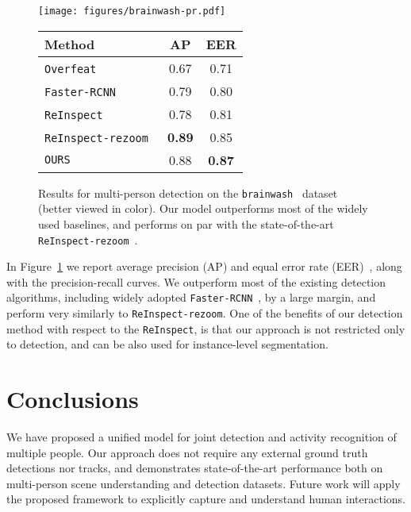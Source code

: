 \documentclass[10pt,twocolumn,letterpaper]{article}
\begin{document}
\begin{figure}[ht!]
\vspace{-0.25cm}
\begin{center}
\texttt{[image: figures/brainwash-pr.pdf]}
\vspace{0.1cm}
\begin{tabular}{|l|c|c|}
\hline
Method & AP & EER \\\hline
\texttt{Overfeat}~\cite{Sermanet2013} & 0.67 & 0.71 \\
\texttt{Faster-RCNN}~\cite{Ren2015} & 0.79 & 0.80 \\
\texttt{ReInspect}~\cite{Stewart2016} & 0.78 & 0.81 \\
\texttt{ReInspect-rezoom}~\cite{Stewart2016} & \textbf{0.89} & 0.85 \\
\texttt{OURS} & 0.88 & \textbf{0.87} \\\hline
\end{tabular}
\end{center}
\caption{Results for multi-person detection on the \texttt{brainwash}~\cite{Stewart2016}
  dataset (better viewed in color). 
  Our model outperforms most of the widely used baselines, and performs on 
  par with the state-of-the-art \texttt{ReInspect-rezoom}~\cite{Stewart2016}. }
\label{fi:eval:detection-brainwash}
\end{figure}

In Figure~\ref{fi:eval:detection-brainwash} we report average precision
(AP) and equal error rate (EER)~\cite{Everingham2015}, along with the
precision-recall curves. We outperform most of the existing
detection algorithms, including widely adopted \texttt{Faster-RCNN}~\cite{Ren2015},
by a large margin, and perform very similarly to \texttt{ReInspect-rezoom}.
One of the benefits of our detection method with respect to the
\texttt{ReInspect}, is that our approach is not restricted only to detection, 
and can be also used for instance-level segmentation.

 \vspace{-0.1cm}
\section{Conclusions}
\vspace{-0.15cm}
We have proposed a unified model for joint detection and activity recognition
of multiple people. Our approach does not require any external ground truth
detections nor tracks, and demonstrates state-of-the-art performance 
both on multi-person scene understanding and detection datasets. 
Future work will apply the proposed framework to explicitly capture 
and understand human interactions. 

 
\newpage
{\small


}
\end{document}
